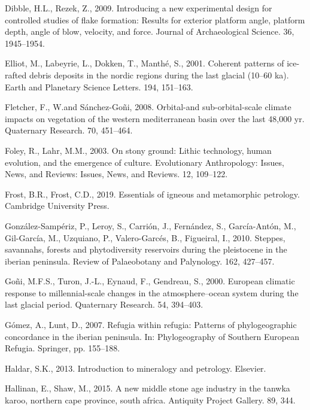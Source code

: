 \documentclass[12pt,twoside]{reedthesis}
\begin{document}
\leavevmode\hypertarget{ref-dibble2009}{}%
Dibble, H.L., Rezek, Z., 2009. Introducing a new experimental design for controlled studies of flake formation: Results for exterior platform angle, platform depth, angle of blow, velocity, and force. Journal of Archaeological Science. 36, 1945--1954.

\leavevmode\hypertarget{ref-elliot2001}{}%
Elliot, M., Labeyrie, L., Dokken, T., Manthé, S., 2001. Coherent patterns of ice-rafted debris deposits in the nordic regions during the last glacial (10--60 ka). Earth and Planetary Science Letters. 194, 151--163.

\leavevmode\hypertarget{ref-fletcher2008}{}%
Fletcher, F., W.and Sánchez-Goñi, 2008. Orbital-and sub-orbital-scale climate impacts on vegetation of the western mediterranean basin over the last 48,000 yr. Quaternary Research. 70, 451--464.

\leavevmode\hypertarget{ref-foley2003}{}%
Foley, R., Lahr, M.M., 2003. On stony ground: Lithic technology, human evolution, and the emergence of culture. Evolutionary Anthropology: Issues, News, and Reviews: Issues, News, and Reviews. 12, 109--122.

\leavevmode\hypertarget{ref-frost2019}{}%
Frost, B.R., Frost, C.D., 2019. Essentials of igneous and metamorphic petrology. Cambridge University Press.

\leavevmode\hypertarget{ref-gonzalez-samperiz2010}{}%
González-Sampériz, P., Leroy, S., Carrión, J., Fernández, S., García-Antón, M., Gil-García, M., Uzquiano, P., Valero-Garcés, B., Figueiral, I., 2010. Steppes, savannahs, forests and phytodiversity reservoirs during the pleistocene in the iberian peninsula. Review of Palaeobotany and Palynology. 162, 427--457.

\leavevmode\hypertarget{ref-goni2000}{}%
Goñi, M.F.S., Turon, J.-L., Eynaud, F., Gendreau, S., 2000. European climatic response to millennial-scale changes in the atmosphere--ocean system during the last glacial period. Quaternary Research. 54, 394--403.

\leavevmode\hypertarget{ref-gomez2007}{}%
Gómez, A., Lunt, D., 2007. Refugia within refugia: Patterns of phylogeographic concordance in the iberian peninsula. In: Phylogeography of Southern European Refugia. Springer, pp. 155--188.

\leavevmode\hypertarget{ref-haldar2013}{}%
Haldar, S.K., 2013. Introduction to mineralogy and petrology. Elsevier.

\leavevmode\hypertarget{ref-hallinan2015}{}%
Hallinan, E., Shaw, M., 2015. A new middle stone age industry in the tanwka karoo, northern cape province, south africa. Antiquity Project Gallery. 89, 344.
\end{document}
